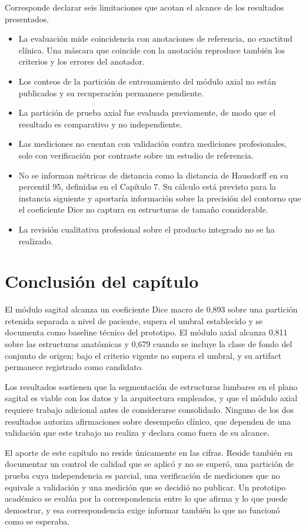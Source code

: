 Corresponde declarar seis limitaciones que acotan el alcance de los resultados presentados.

\begin{itemize}
\item La evaluación mide coincidencia con anotaciones de referencia, no exactitud clínica. Una máscara que coincide con la anotación reproduce también los criterios y los errores del anotador.
\item Los conteos de la partición de entrenamiento del módulo axial no están publicados y su recuperación permanece pendiente.
\item La partición de prueba axial fue evaluada previamente, de modo que el resultado es comparativo y no independiente.
\item Las mediciones no cuentan con validación contra mediciones profesionales, solo con verificación por contraste sobre un estudio de referencia.
\item No se informan métricas de distancia como la distancia de Hausdorff en su percentil 95, definidas en el Capítulo 7. Su cálculo está previsto para la instancia siguiente y aportaría información sobre la precisión del contorno que el coeficiente Dice no captura en estructuras de tamaño considerable.
\item La revisión cualitativa profesional sobre el producto integrado no se ha realizado.
\end{itemize}

\section{Conclusión del capítulo}

El módulo sagital alcanza un coeficiente Dice macro de 0,893 sobre una partición retenida separada a nivel de paciente, supera el umbral establecido y se documenta como baseline técnico del prototipo. El módulo axial alcanza 0,811 sobre las estructuras anatómicas y 0,679 cuando se incluye la clase de fondo del conjunto de origen; bajo el criterio vigente no supera el umbral, y su artifact permanece registrado como candidato.

Los resultados sostienen que la segmentación de estructuras lumbares en el plano sagital es viable con los datos y la arquitectura empleados, y que el módulo axial requiere trabajo adicional antes de considerarse consolidado. Ninguno de los dos resultados autoriza afirmaciones sobre desempeño clínico, que dependen de una validación que este trabajo no realiza y declara como fuera de su alcance.

El aporte de este capítulo no reside únicamente en las cifras. Reside también en documentar un control de calidad que se aplicó y no se superó, una partición de prueba cuya independencia es parcial, una verificación de mediciones que no equivale a validación y una medición que se decidió no publicar. Un prototipo académico se evalúa por la correspondencia entre lo que afirma y lo que puede demostrar, y esa correspondencia exige informar también lo que no funcionó como se esperaba.
